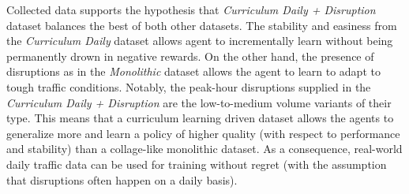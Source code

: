 Collected data supports the hypothesis that \textit{Curriculum Daily + Disruption} dataset balances the best of both other datasets.
The stability and easiness from the \textit{Curriculum Daily} dataset allows agent to incrementally learn without being permanently drown in negative rewards.
On the other hand, the presence of disruptions as in the \textit{Monolithic} dataset allows the agent to learn to adapt to tough traffic conditions.
Notably, the peak-hour disruptions supplied in the \textit{Curriculum Daily + Disruption} are the low-to-medium volume variants of their type.
This means that a curriculum learning driven dataset allows the agents to generalize more and learn a policy of higher quality (with respect to performance and stability) than a collage-like monolithic dataset.
As a consequence, real-world daily traffic data can be used for training without regret (with the assumption that disruptions often happen on a daily basis).



